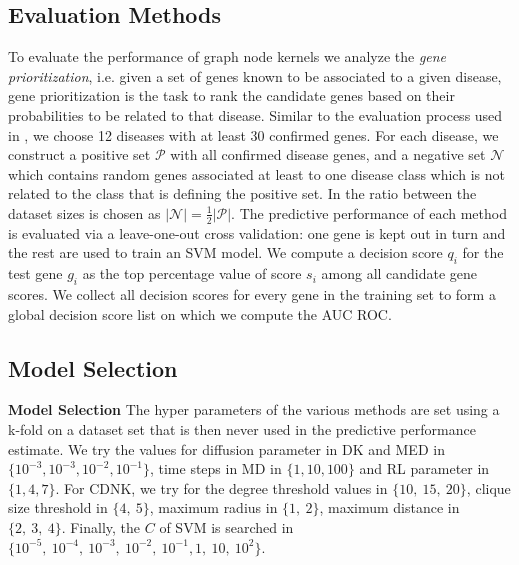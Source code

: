 \documentclass[runningheads,a4paper]{llncs}
\begin{document}
\subsection{Evaluation Methods}
To evaluate the performance of graph node kernels we analyze the {\em gene prioritization}, i.e. given a set of genes known to be associated to a given disease, gene prioritization is the task to rank the candidate genes based on their probabilities to be related to that disease. Similar to the evaluation process used in \cite{medk}, we choose 12 diseases with at least 30 confirmed genes. For each disease, we construct a positive set $\mathcal{P}$ with all confirmed disease genes, and a negative set $\mathcal{N}$ which contains random genes associated at least to one disease class which is not related to the class that is defining the positive set. In \cite{medk} the ratio between the dataset sizes is chosen as $\vert \mathcal{N} \vert = \frac{1}{2} \vert \mathcal{P} \vert$. The predictive performance of each method is evaluated via a leave-one-out cross validation: one gene is kept out in turn and the rest are used to train an SVM model. We compute a decision score $q_i$ for the test gene $g_i$ as the top percentage value of score $s_i$ among all candidate gene scores. We collect all decision scores for every gene in the training set to form a global decision score list on which we compute the AUC ROC.
\subsection{Model Selection}
\textbf{Model Selection}
The hyper parameters of the various methods are set using a k-fold on a dataset set that is then never used in the predictive performance estimate. We try the values for diffusion parameter in DK and MED in $\lbrace 10^{-3}, 10^{-3}, 10^{-2}, 10^{-1} \rbrace$, time steps in MD in $\lbrace 1, 10, 100 \rbrace$ and RL parameter in $\lbrace 1, 4, 7 \rbrace$. For CDNK, we try for the degree threshold values in $\lbrace 10,\ 15,\ 20 \rbrace$, clique size threshold in $\lbrace 4,\ 5 \rbrace$, maximum radius in $\lbrace 1,\ 2 \rbrace$, maximum distance in $\lbrace 2,\ 3,\ 4 \rbrace$. Finally, the $C$ of SVM is searched in $\lbrace 10^{-5},  \ 10^{-4}, \ 10^{-3},\ 10^{-2},\ 10^{-1}, 1,\ 10,\ 10^2 \rbrace$.
\end{document}

